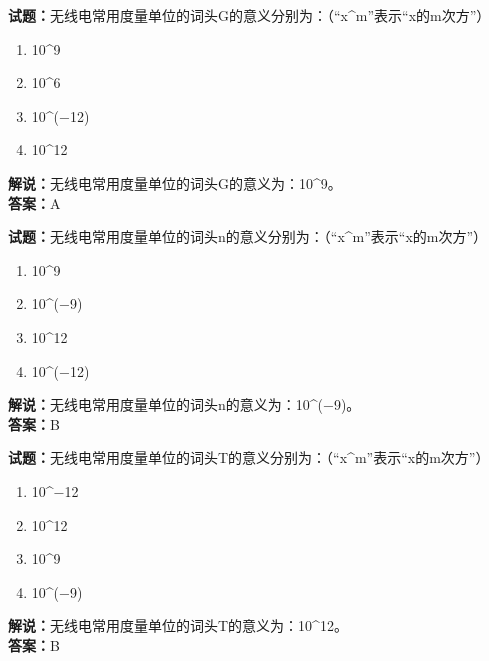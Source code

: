 \documentclass{ctexbook}
\begin{document}
\bigskip


\noindent\textbf{试题：}无线电常用度量单位的词头G的意义分别为：（“x\string^m”表示“x的m次方”）

\begin{enumerate}[leftmargin=3em]
	\item \num{10}\string^\num{9}
	\item \num{10}\string^\num{6}
	\item \num{10}\string^(\num{-12})
	\item \num{10}\string^\num{12}
\end{enumerate}

\noindent\textbf{解说：}无线电常用度量单位的词头G的意义为：\num{10}\string^\num{9}\cite[143]{si}。\\
\noindent\textbf{答案：}A


\bigskip


\noindent\textbf{试题：}无线电常用度量单位的词头n的意义分别为：（“x\string^m”表示“x的m次方”）

\begin{enumerate}[leftmargin=3em]
	\item \num{10}\string^\num{9}
	\item \num{10}\string^(\num{-9})
	\item \num{10}\string^\num{12}
	\item \num{10}\string^(\num{-12})
\end{enumerate}

\noindent\textbf{解说：}无线电常用度量单位的词头n的意义为：\num{10}\string^(\num{-9})。\cite[143]{si}\\
\noindent\textbf{答案：}B


\bigskip


\noindent\textbf{试题：}无线电常用度量单位的词头T的意义分别为：（“x\string^m”表示“x的m次方”）

\begin{enumerate}[leftmargin=3em]
	\item \num{10}\string^\num{-12}
	\item \num{10}\string^\num{12}
	\item \num{10}\string^\num{9}
	\item \num{10}\string^(\num{-9})
\end{enumerate}

\noindent\textbf{解说：}无线电常用度量单位的词头T的意义为：\num{10}\string^\num{12}。\cite[143]{si}\\
\noindent\textbf{答案：}B


\bigskip
\end{document}
